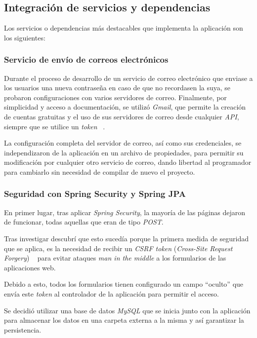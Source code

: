 \subsection{Integración de servicios y dependencias}

Los servicios o dependencias más destacables que implementa la aplicación son los siguientes:

\subsubsection{Servicio de envío de correos electrónicos}

Durante el proceso de desarrollo de un servicio de correo electrónico que enviase a los usuarios una nueva contraseña en caso de que no recordasen la suya, se probaron configuraciones con varios servidores de correo. Finalmente, por simplicidad y acceso a documentación, se utilizó \textit{Gmail}, que permite la creación de cuentas gratuitas y el uso de sus servidores de correo desde cualquier \textit{API}, siempre que se utilice un \textit{token} ~\cite{gmail:token}.

La configuración completa del servidor de correo, así como sus credenciales, se independizaron de la aplicación en un archivo de propiedades, para permitir su modificación por cualquier otro servicio de correo, dando libertad al programador para cambiarlo sin necesidad de compilar de nuevo el proyecto.

\subsubsection{Seguridad con Spring Security y Spring JPA}

En primer lugar, tras aplicar \textit{Spring Security}, la mayoría de las páginas dejaron de funcionar, todas aquellas que eran de tipo \textit{POST}.

Tras investigar descubrí que esto sucedía porque la primera medida de seguridad que se aplica, es la necesidad de recibir un \textit{CSRF token} (\textit{Cross-Site Request Forgery}) ~\cite{web:csrf} para evitar ataques \textit{man in the middle} a los formularios de las aplicaciones web.

Debido a esto, todos los formularios tienen configurado un campo ``oculto'' que envía este \textit{token} al controlador de la aplicación para permitir el acceso.

Se decidió utilizar una base de datos \textit{MySQL} que se inicia junto con la aplicación para almacenar los datos en una carpeta externa a la misma y así garantizar la persistencia.

